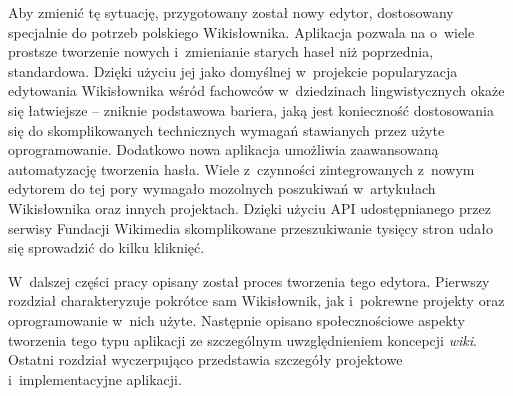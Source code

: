 Aby zmienić tę sytuację, przygotowany został nowy edytor, dostosowany specjalnie do potrzeb polskiego Wikisłownika. Aplikacja pozwala na o~wiele prostsze tworzenie nowych i~zmienianie starych haseł niż poprzednia, standardowa. Dzięki użyciu jej jako domyślnej w~projekcie popularyzacja edytowania Wikisłownika wśród fachowców w~dziedzinach lingwistycznych okaże się łatwiejsze -- zniknie podstawowa bariera, jaką jest konieczność dostosowania się do skomplikowanych technicznych wymagań stawianych przez użyte oprogramowanie. Dodatkowo nowa aplikacja umożliwia zaawansowaną automatyzację tworzenia hasła. Wiele z~czynności zintegrowanych z~nowym edytorem do tej pory wymagało mozolnych poszukiwań w~artykułach Wikisłownika oraz innych projektach. Dzięki użyciu API udostępnianego przez serwisy Fundacji Wikimedia skomplikowane przeszukiwanie tysięcy stron udało się sprowadzić do kilku kliknięć.

W~dalszej części pracy opisany został proces tworzenia tego edytora. Pierwszy rozdział charakteryzuje pokrótce sam Wikisłownik, jak i~pokrewne projekty oraz oprogramowanie w~nich użyte. Następnie opisano społecznościowe aspekty tworzenia tego typu aplikacji ze szczególnym uwzględnieniem koncepcji \emph{wiki}. Ostatni rozdział wyczerpująco przedstawia szczegóły projektowe i~implementacyjne aplikacji.
